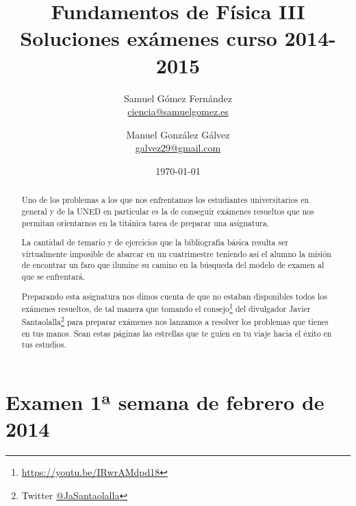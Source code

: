 \documentclass[12pt, a4paper]{article}
\title{Fundamentos de Física III \\ Soluciones exámenes curso 2014-2015}
\date{\today}
\author{
    Samuel Gómez Fernández \\ \href{mailto:ciencia@samuelgomez.es}{ciencia@samuelgomez.es}
    \and
    Manuel González Gálvez \\ \href{mailto:galvez29@gmail.com}{galvez29@gmail.com}
    }
\begin{document}
    \begin{titlepage}
    \maketitle
    \thispagestyle{empty}
    \hypersetup{pageanchor=true}
    \renewcommand*\contentsname{Contenidos}

    \tableofcontents

    \vspace{1cm}
    \begin{abstract}
        Uno de los problemas a los que nos enfrentamos los estudiantes universitarios
        en general y de la UNED en particular es la de conseguir exámenes resueltos
        que nos permitan orientarnos en la titánica tarea de preparar una asignatura.

        La cantidad de temario y de ejercicios que la bibliografía básica resulta ser
        virtualmente imposible de abarcar en un cuatrimestre teniendo así el alumno
        la misión de encontrar un faro que ilumine su camino en la búsqueda del modelo
        de examen al que se enfrentará.

        Preparando esta asignatura nos dimos cuenta de que no estaban disponibles todos los
        exámenes resueltos, de tal manera que tomando el
        consejo\footnote{\href{https://youtu.be/IRwrAMdpd18}{https://youtu.be/IRwrAMdpd18}} del divulgador
        Javier Santaolalla\footnote{Twitter \href{https://twitter.com/jasantaolalla}{@JaSantaolalla}}
        para preparar exámenes nos lanzamos a resolver los problemas que tienes
        en tus manos. Sean estas páginas las estrellas que te guíen en tu viaje
        hacia el éxito en tus estudios.
    \end{abstract}
    \end{titlepage}



    \restoregeometry

    \section{Examen 1ª semana de febrero de 2014}
\end{document}
